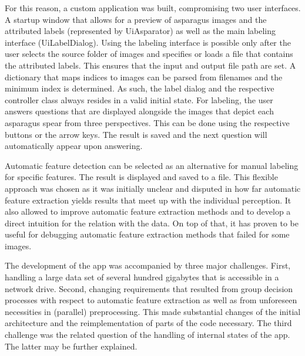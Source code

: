 \bigskip
For this reason, a custom application was built, compromising two user interfaces. A startup window that allows for a preview of asparagus images and the attributed labels (represented by Ui\textunderscore Asparator) as well as the main labeling interface (Ui\textunderscore LabelDialog). Using the labeling interface is possible only after the user selects the source folder of images and specifies or loads a file that contains the attributed labels. This ensures that the input and output file path are set. A dictionary that maps indices to images can be parsed from filenames and the minimum index is determined. As such, the label dialog and the respective controller class always resides in a valid initial state. For labeling, the user answers questions that are displayed alongside the images that depict each asparagus spear from three perspectives. This can be done using the respective buttons or the arrow keys. The result is saved and the next question will automatically appear upon answering. 

Automatic feature detection can be selected as an alternative for manual labeling for specific features. The result is displayed and saved to a file. This flexible approach was chosen as it was initially unclear and disputed in how far automatic feature extraction yields results that meet up with the individual perception. It also allowed to improve automatic feature extraction methods and to develop a direct intuition for the relation with the data. On top of that, it has proven to be useful for debugging automatic feature extraction methods that failed for some images.

\bigskip
The development of the app was accompanied by three major challenges. First, handling a large data set of several hundred gigabytes that is accessible in a network drive. Second, changing requirements that resulted from group decision processes with respect to automatic feature extraction as well as from unforeseen necessities in (parallel) preprocessing. This made substantial changes of the initial architecture and the reimplementation of parts of the code necessary. The third challenge was the related question of the handling of internal states of the app. The latter may be further explained. 


